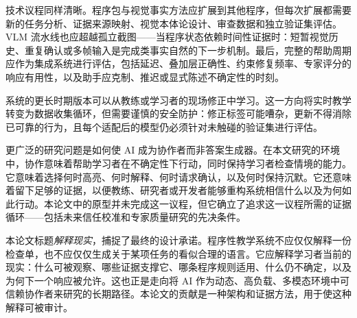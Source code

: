 技术议程同样清晰。程序包与视觉事实方法应扩展到其他程序，但每次扩展都需要新的任务分析、证据来源映射、视觉本体论设计、审查数据和独立验证集评估。VLM 流水线也应超越孤立截图——当程序状态依赖时间性证据时：短暂视觉历史、重复确认或多帧输入是完成类事实自然的下一步机制。最后，完整的帮助周期应作为集成系统进行评估，包括延迟、叠加层正确性、约束修复频率、专家评分的响应有用性，以及助手应克制、推迟或显式陈述不确定性的时刻。

系统的更长时期版本可以从教练或学习者的现场修正中学习。这一方向将实时教学转变为数据收集循环，但需要谨慎的安全防护：修正标签可能嘈杂，更新不得消除已可靠的行为，且每个适配后的模型仍必须针对未触碰的验证集进行评估。

更广泛的研究问题是如何使 AI 成为协作者而非答案生成器。在本文研究的环境中，协作意味着帮助学习者在不确定性下行动，同时保持学习者检查情境的能力。它意味着选择何时高亮、何时解释、何时请求确认，以及何时保持沉默。它还意味着留下足够的证据，以便教练、研究者或开发者能够重构系统相信什么以及为何如此行动。本论文中的原型并未完成这一议程，但它确立了追求这一议程所需的证据循环——包括未来信任校准和专家质量研究的先决条件。

本论文标题\emph{解释现实}，捕捉了最终的设计承诺。程序性教学系统不应仅仅解释一份检查单，也不应仅仅生成关于某项任务的看似合理的语言。它应解释学习者当前的现实：什么可被观察、哪些证据支撑它、哪条程序规则适用、什么仍不确定，以及为何下一个响应被允许。这也正是走向将 AI 作为动态、高负载、多模态环境中可信赖协作者来研究的长期路径。本论文的贡献是一种架构和证据方法，用于使这种解释可被审计。
